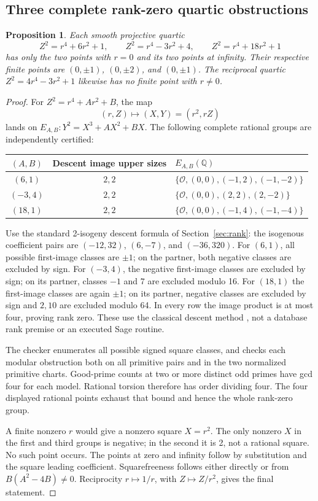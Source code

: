 \documentclass[11pt,letterpaper]{article}
\newtheorem{proposition}[theorem]{Proposition}
\theoremstyle{definition}\newtheorem{definition}[theorem]{Definition}
\theoremstyle{remark}\newtheorem{remark}[theorem]{Remark}
\newcommand{\Q}{\mathbb Q}\newcommand{\Z}{\mathbb Z}\newcommand{\R}{\mathbb R}
\begin{document}
\subsection{Three complete rank-zero quartic obstructions}
\begin{proposition}\label{prop:d1quartics}
Each smooth projective quartic
\[
 Z^2=r^4+6r^2+1,\qquad
 Z^2=r^4-3r^2+4,\qquad
 Z^2=r^4+18r^2+1
\]
has only the two points with $r=0$ and its two points at infinity. Their respective finite points are $(0,\pm1)$, $(0,\pm2)$, and $(0,\pm1)$. The reciprocal quartic $Z^2=4r^4-3r^2+1$ likewise has no finite point with $r\ne0$.
\end{proposition}
\begin{proof}
For $Z^2=r^4+Ar^2+B$, the map
\[
 (r,Z)\longmapsto (X,Y)=(r^2,rZ)
\]
lands on $E_{A,B}:Y^2=X^3+AX^2+BX$. The following complete rational groups are independently certified:
\begin{center}\small
\begin{tabular}{ccl}
\toprule
$(A,B)$ & Descent image upper sizes & $E_{A,B}(\Q)$\\
\midrule
$(6,1)$ &$2,2$& $\{\mathcal O,(0,0),(-1,2),(-1,-2)\}$\\
$(-3,4)$ &$2,2$& $\{\mathcal O,(0,0),(2,2),(2,-2)\}$\\
$(18,1)$ &$2,2$& $\{\mathcal O,(0,0),(-1,4),(-1,-4)\}$\\
\bottomrule
\end{tabular}\end{center}
Use the standard 2-isogeny descent formula of Section~\ref{sec:rank}: the isogenous coefficient pairs are $(-12,32)$, $(6,-7)$, and $(-36,320)$. For $(6,1)$, all possible first-image classes are $\pm1$; on the partner, both negative classes are excluded by sign. For $(-3,4)$, the negative first-image classes are excluded by sign; on its partner, classes $-1$ and $7$ are excluded modulo 16. For $(18,1)$ the first-image classes are again $\pm1$; on its partner, negative classes are excluded by sign and $2,10$ are excluded modulo 64. In every row the image product is at most four, proving rank zero. These use the classical descent method \cite{SageDescent}, not a database rank premise or an executed Sage routine.

The checker enumerates all possible signed square classes, and checks each modular obstruction both on all primitive pairs and in the two normalized primitive charts. Good-prime counts at two or more distinct odd primes have gcd four for each model. Rational torsion therefore has order dividing four. The four displayed rational points exhaust that bound and hence the whole rank-zero group.

A finite nonzero $r$ would give a nonzero square $X=r^2$. The only nonzero $X$ in the first and third groups is negative; in the second it is 2, not a rational square. No such point occurs. The points at zero and infinity follow by substitution and the square leading coefficient. Squarefreeness follows either directly or from $B(A^2-4B)\ne0$. Reciprocity $r\mapsto1/r$, with $Z\mapsto Z/r^2$, gives the final statement.
\end{proof}
\end{document}
